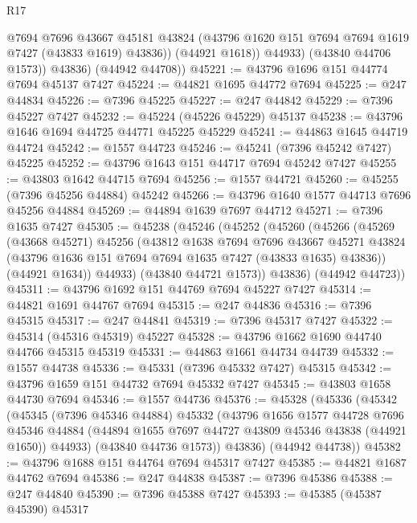 \begin{lexlean}{R17}
\begin{coremodule}
                @7694
                @7696
                @43667
                @45181
                @43824
                (@43796 @1620 @151 @7694 @7694 @1619 @7427 (@43833 @1619) @43836))
              (@44921 @1618))
            @44933)
          (@43840 @44706 @1573))
        @43836)
      (@44942 @44708))
@45221 := @43796 @1696 @151 @44774 @7694 @45137 @7427
@45224 := @44821 @1695 @44772 @7694
@45225 := @247 @44834
@45226 := @7396 @45225
@45227 := @247 @44842
@45229 := @7396 @45227 @7427
@45232 := @45224 (@45226 @45229) @45137
@45238 := @43796 @1646 @1694 @44725 @44771 @45225 @45229
@45241 := @44863 @1645 @44719 @44724
@45242 := @1557 @44723
@45246 := @45241 (@7396 @45242 @7427) @45225
@45252 := @43796 @1643 @151 @44717 @7694 @45242 @7427
@45255 := @43803 @1642 @44715 @7694
@45256 := @1557 @44721
@45260 := @45255 (@7396 @45256 @44884) @45242
@45266 := @43796 @1640 @1577 @44713 @7696 @45256 @44884
@45269 := @44894 @1639 @7697 @44712
@45271 := @7396 @1635 @7427
@45305 := @45238
    (@45246
      (@45252
        (@45260
          (@45266
            (@45269
              (@43668 @45271)
              @45256
              (@43812
                @1638
                @7694
                @7696
                @43667
                @45271
                @43824
                (@43796 @1636 @151 @7694 @7694 @1635 @7427 (@43833 @1635) @43836))
              (@44921 @1634))
            @44933)
          (@43840 @44721 @1573))
        @43836)
      (@44942 @44723))
@45311 := @43796 @1692 @151 @44769 @7694 @45227 @7427
@45314 := @44821 @1691 @44767 @7694
@45315 := @247 @44836
@45316 := @7396 @45315
@45317 := @247 @44841
@45319 := @7396 @45317 @7427
@45322 := @45314 (@45316 @45319) @45227
@45328 := @43796 @1662 @1690 @44740 @44766 @45315 @45319
@45331 := @44863 @1661 @44734 @44739
@45332 := @1557 @44738
@45336 := @45331 (@7396 @45332 @7427) @45315
@45342 := @43796 @1659 @151 @44732 @7694 @45332 @7427
@45345 := @43803 @1658 @44730 @7694
@45346 := @1557 @44736
@45376 := @45328
    (@45336
      (@45342
        (@45345
          (@7396 @45346 @44884)
          @45332
          (@43796
            @1656
            @1577
            @44728
            @7696
            @45346
            @44884
            (@44894 @1655 @7697 @44727 @43809 @45346 @43838 (@44921 @1650))
            @44933)
          (@43840 @44736 @1573))
        @43836)
      (@44942 @44738))
@45382 := @43796 @1688 @151 @44764 @7694 @45317 @7427
@45385 := @44821 @1687 @44762 @7694
@45386 := @247 @44838
@45387 := @7396 @45386
@45388 := @247 @44840
@45390 := @7396 @45388 @7427
@45393 := @45385 (@45387 @45390) @45317

\end{coremodule}
\end{lexlean}
